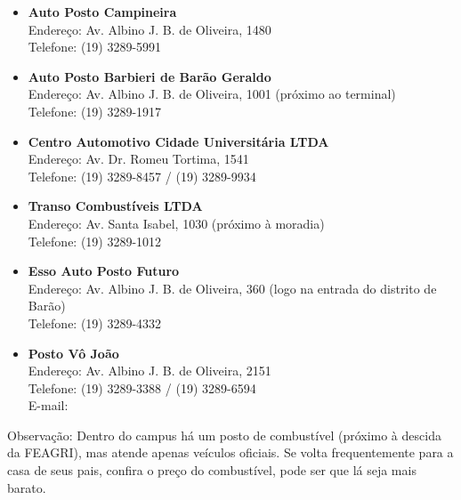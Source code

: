 \begin{itemize}
    \item   \textbf{Auto Posto Campineira}
        \\Endereço: Av. Albino J. B. de Oliveira, 1480
        \\Telefone: (19) 3289-5991

    \item   \textbf{Auto Posto Barbieri de Barão Geraldo}
        \\Endereço: Av. Albino J. B. de Oliveira, 1001 (próximo ao terminal)
        \\Telefone: (19) 3289-1917

    \item   \textbf{Centro Automotivo Cidade Universitária LTDA}
        \\Endereço: Av. Dr. Romeu Tortima, 1541
        \\Telefone: (19) 3289-8457 / (19) 3289-9934

    \item   \textbf{Transo Combustíveis LTDA}
        \\Endereço: Av. Santa Isabel, 1030 (próximo à moradia)
        \\Telefone: (19) 3289-1012

    \item   \textbf{Esso Auto Posto Futuro}
        \\Endereço: Av. Albino J. B. de Oliveira, 360 (logo na entrada do
        distrito de Barão)
        \\Telefone: (19) 3289-4332

    \item   \textbf{Posto Vô João}
        \\Endereço: Av. Albino J. B. de Oliveira, 2151
        \\Telefone: (19) 3289-3388 / (19) 3289-6594
        \\E-mail: 
\end{itemize}


Observação: Dentro do campus há um posto de combustível (próximo à descida da
FEAGRI), mas atende apenas veículos oficiais. Se volta frequentemente para a
casa de seus pais, confira o preço do combustível, pode ser que lá seja mais
barato.
